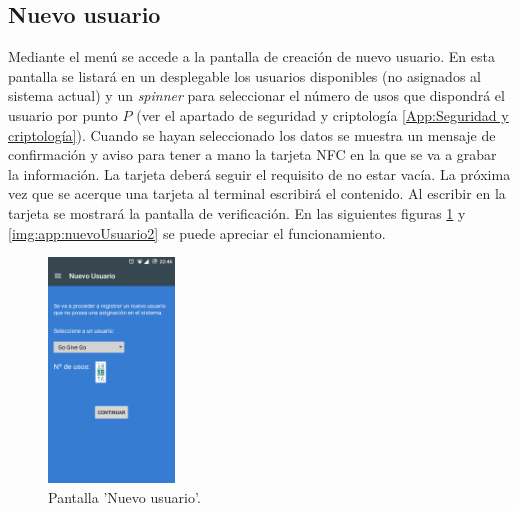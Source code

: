 \documentclass[../PFC.tex]{subfiles}
\begin{document}
\subsection{Nuevo usuario}
\label{App:AD:Nuevo usuario}

Mediante el menú se accede a la pantalla de creación de nuevo usuario. En esta pantalla se listará en un desplegable los usuarios disponibles (no asignados al sistema actual) y un \textit{spinner} para seleccionar el número de usos que dispondrá el usuario por punto $P$ (ver el apartado de seguridad y criptología \ref{App:Seguridad y criptología}). Cuando se hayan seleccionado los datos se muestra un mensaje de confirmación y aviso para tener a mano la tarjeta NFC en la que se va a grabar la información. La tarjeta deberá seguir el requisito de no estar vacía. La próxima vez que se acerque una tarjeta al terminal escribirá el contenido. Al escribir en la tarjeta se mostrará la pantalla de verificación. En las siguientes figuras \ref{img:app:nuevoUsuario1} y \ref{img:app:nuevoUsuario2} se puede apreciar el funcionamiento.

\begin{figure}[H]
  \centering
  \includegraphics[width=0.3\textwidth]{./img/app/nuevoUsuario}
  \caption{Pantalla 'Nuevo usuario'.}
  \label{img:app:nuevoUsuario1}
\end{figure}  
\end{document}
